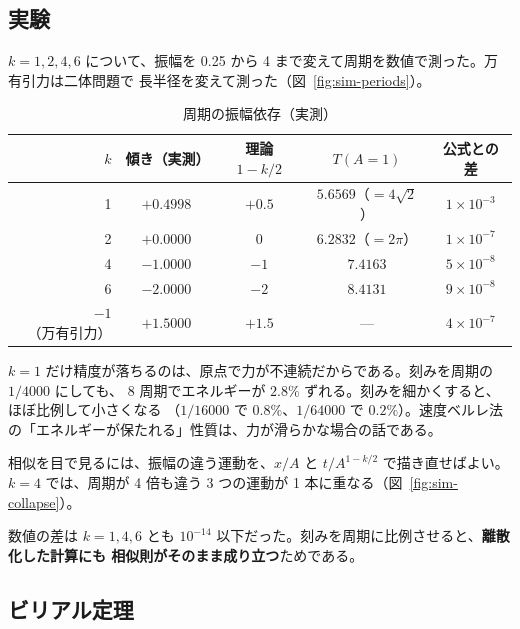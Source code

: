 \subsection*{実験}

$k=1,2,4,6$ について、振幅を 0.25 から 4 まで変えて周期を数値で測った。万有引力は二体問題で
長半径を変えて測った（図~\ref{fig:sim-periods}）。


\begin{table}[htbp]
\centering
\caption{周期の振幅依存（実測）}\label{tab:periods}
\begin{tabular}{rcccc}
\toprule
$k$ & 傾き（実測） & 理論 $1-k/2$ & $T(A=1)$ & 公式との差 \\
\midrule
1 & $+0.4998$ & $+0.5$ & $5.6569$（$=4\sqrt2$） & $1\times10^{-3}$ \\
2 & $+0.0000$ & $0$    & $6.2832$（$=2\pi$） & $1\times10^{-7}$ \\
4 & $-1.0000$ & $-1$   & $7.4163$ & $5\times10^{-8}$ \\
6 & $-2.0000$ & $-2$   & $8.4131$ & $9\times10^{-8}$ \\
$-1$（万有引力） & $+1.5000$ & $+1.5$ & --- & $4\times10^{-7}$ \\
\bottomrule
\end{tabular}
\end{table}

\begin{note}
$k=1$ だけ精度が落ちるのは、原点で力が不連続だからである。刻みを周期の $1/4000$ にしても、
8 周期でエネルギーが $2.8\%$ ずれる。刻みを細かくすると、ほぼ比例して小さくなる
（$1/16000$ で $0.8\%$、$1/64000$ で $0.2\%$）。速度ベルレ法の「エネルギーが保たれる」性質は、力が滑らかな場合の話である。
\end{note}

相似を目で見るには、振幅の違う運動を、$x/A$ と $t/A^{1-k/2}$ で描き直せばよい。
$k=4$ では、周期が 4 倍も違う 3 つの運動が 1 本に重なる（図~\ref{fig:sim-collapse}）。


数値の差は $k=1,4,6$ とも $10^{-14}$ 以下だった。刻みを周期に比例させると、\textbf{離散化した計算にも
相似則がそのまま成り立つ}ためである。

\subsection*{ビリアル定理}

